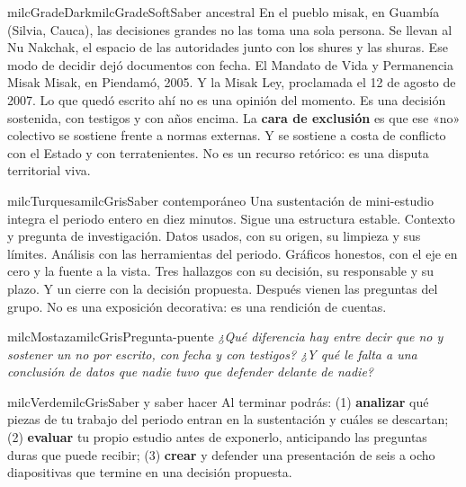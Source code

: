 \documentclass[11pt,letterpaper]{article}
\begin{document}
\begin{softbox}{milcGradeDark}{milcGradeSoft}{Saber ancestral}
En el pueblo misak, en Guambía (Silvia, Cauca), las decisiones grandes no las toma una sola persona. Se llevan al Nu Nakchak, el espacio de las autoridades junto con los shures y las shuras. Ese modo de decidir dejó documentos con fecha. El Mandato de Vida y Permanencia Misak Misak, en Piendamó, 2005. Y la Misak Ley, proclamada el 12 de agosto de 2007. Lo que quedó escrito ahí no es una opinión del momento. Es una decisión sostenida, con testigos y con años encima. La \textbf{cara de exclusión} es que ese «no» colectivo se sostiene frente a normas externas. Y se sostiene a costa de conflicto con el Estado y con terratenientes. No es un recurso retórico: es una disputa territorial viva.\par{}
\end{softbox}

\begin{softbox}{milcTurquesa}{milcGris}{Saber contemporáneo}
Una sustentación de mini-estudio integra el periodo entero en diez minutos. Sigue una estructura estable. Contexto y pregunta de investigación. Datos usados, con su origen, su limpieza y sus límites. Análisis con las herramientas del periodo. Gráficos honestos, con el eje en cero y la fuente a la vista. Tres hallazgos con su decisión, su responsable y su plazo. Y un cierre con la decisión propuesta. Después vienen las preguntas del grupo. No es una exposición decorativa: es una rendición de cuentas.
\end{softbox}

\begin{softbox}{milcMostaza}{milcGris}{Pregunta-puente}
\textit{¿Qué diferencia hay entre decir que no y sostener un no por escrito, con fecha y con testigos? ¿Y qué le falta a una conclusión de datos que nadie tuvo que defender delante de nadie?}
\end{softbox}

\begin{softbox}{milcVerde}{milcGris}{Saber y saber hacer}
Al terminar podrás: (1) \textbf{analizar} qué piezas de tu trabajo del periodo entran en la sustentación y cuáles se descartan; (2) \textbf{evaluar} tu propio estudio antes de exponerlo, anticipando las preguntas duras que puede recibir; (3) \textbf{crear} y defender una presentación de seis a ocho diapositivas que termine en una decisión propuesta.
\end{softbox}
\end{document}
